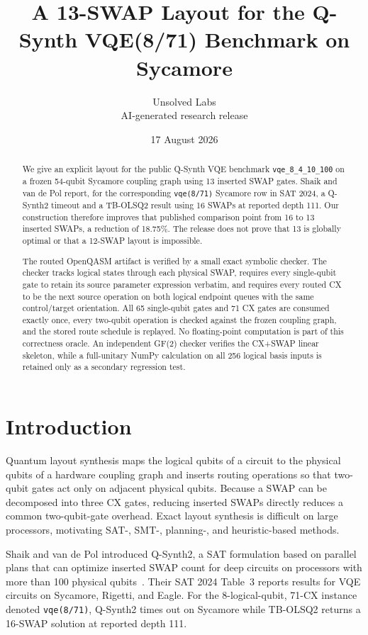 \documentclass[11pt]{article}
\title{A 13-SWAP Layout for the Q-Synth VQE(8/71) Benchmark on Sycamore}
\author{Unsolved Labs\\\small AI-generated research release}
\date{17 August 2026}
\begin{document}
\maketitle

\begin{abstract}
We give an explicit layout for the public Q-Synth VQE benchmark
\texttt{vqe\_8\_4\_10\_100} on a frozen 54-qubit Sycamore coupling graph using
13 inserted SWAP gates.  Shaik and van de Pol report, for the corresponding
\texttt{vqe(8/71)} Sycamore row in SAT 2024, a Q-Synth2 timeout and a
TB-OLSQ2 result using 16 SWAPs at reported depth 111.  Our construction
therefore improves that published comparison point from 16 to 13 inserted
SWAPs, a reduction of 18.75\%.  The release does not prove that 13 is globally
optimal or that a 12-SWAP layout is impossible.

The routed OpenQASM artifact is verified by a small exact symbolic checker.
The checker tracks logical states through each physical SWAP, requires every
single-qubit gate to retain its source parameter expression verbatim, and
requires every routed CX to be the next source operation on both logical
endpoint queues with the same control/target orientation.  All 65 single-qubit
gates and 71 CX gates are consumed exactly once, every two-qubit operation is
checked against the frozen coupling graph, and the stored route schedule is
replayed.  No floating-point computation is part of this correctness oracle.
An independent GF(2) checker verifies the CX+SWAP linear skeleton, while a
full-unitary NumPy calculation on all 256 logical basis inputs is retained only
as a secondary regression test.
\end{abstract}

\section{Introduction}

Quantum layout synthesis maps the logical qubits of a circuit to the physical
qubits of a hardware coupling graph and inserts routing operations so that
two-qubit gates act only on adjacent physical qubits.  Because a SWAP can be
decomposed into three CX gates, reducing inserted SWAPs directly reduces a
common two-qubit-gate overhead.  Exact layout synthesis is difficult on large
processors, motivating SAT-, SMT-, planning-, and heuristic-based methods.

Shaik and van de Pol introduced Q-Synth2, a SAT formulation based on parallel
plans that can optimize inserted SWAP count for deep circuits on processors
with more than 100 physical qubits~\cite{shaik2024}.  Their SAT 2024 Table~3
reports results for VQE circuits on Sycamore, Rigetti, and Eagle.  For the
8-logical-qubit, 71-CX instance denoted \texttt{vqe(8/71)}, Q-Synth2 times out
on Sycamore while TB-OLSQ2 returns a 16-SWAP solution at reported depth 111.
\end{document}
